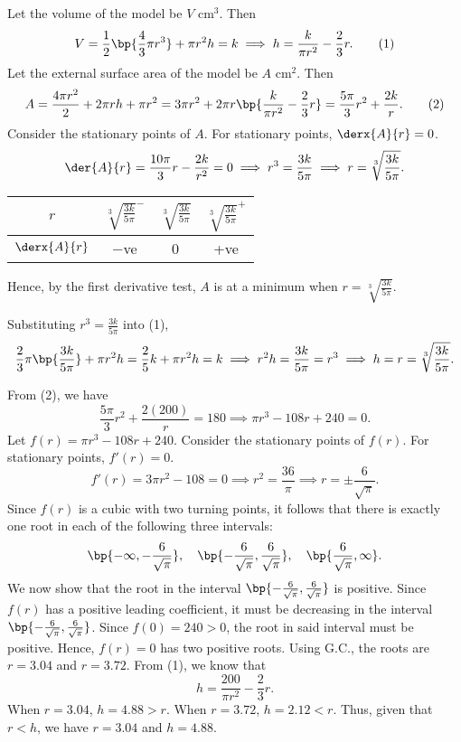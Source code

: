 \begin{solution}
    \begin{ppart}
        Let the volume of the model be $V$ cm$^3$. Then \[V = \frac12\bp{\frac43 \pi r^3} + \pi r^2 h = k \implies h = \frac{k}{\pi r^2}-\frac23 r. \tag{1}\] Let the external surface area of the model be $A$ cm$^2$. Then \[A = \frac{4\pi r^2}2 + 2\pi r h + \pi r^2 = 3\pi r^2 + 2\pi r\bp{\frac{k}{\pi r^2}-\frac23 r} = \frac{5\pi}3 r^2 + \frac{2k}{r}. \tag{2}\] Consider the stationary points of $A$. For stationary points, $\derx{A}{r} = 0$. \[\der{A}{r} = \frac{10\pi}3 r - \frac{2k}{r^2} = 0 \implies r^3 = \frac{3k}{5\pi} \implies r = \sqrt[3]{\frac{3k}{5\pi}}.\]

        \begin{table}[H]
            \centering
            \begin{tabular}{|c|c|c|c|}
            \hline
            $r$ & $\sqrt[3]{\frac{3k}{5\pi}}^-$ & $\sqrt[3]{\frac{3k}{5\pi}}$ & $\sqrt[3]{\frac{3k}{5\pi}}^+$ \\\hline
            $\derx{A}{r}$ & $-$ve   & 0 & +ve   \\\hline
            \end{tabular}
        \end{table}
        Hence, by the first derivative test, $A$ is at a minimum when $r = \sqrt[3]{\frac{3k}{5\pi}}$.

        Substituting $r^3 = \frac{3k}{5\pi}$ into (1), \[\frac23 \pi \bp{\frac{3k}{5\pi}} + \pi r^2 h = \frac{2}{5}k + \pi r^2h = k \implies r^2 h = \frac{3k}{5\pi} = r^3 \implies h = r = \sqrt[3]{\frac{3k}{5\pi}}.\]
    \end{ppart}
    \begin{ppart}
        From (2), we have \[\frac{5\pi}3 r^2 + \frac{2(200)}{r} = 180 \implies \pi r^3 - 108r + 240 = 0.\] Let $f(r) = \pi r^3 - 108r + 240$. Consider the stationary points of $f(r)$. For stationary points, $f'(r) = 0$. \[f'(r) = 3\pi r^2 - 108 = 0 \implies r^2 = \frac{36}{\pi} \implies r = \pm \frac6{\sqrt\pi}.\] Since $f(r)$ is a cubic with two turning points, it follows that there is exactly one root in each of the following three intervals: \[\bp{-\infty, -\frac6{\sqrt\pi}}, \quad \bp{-\frac6{\sqrt\pi}, \frac6{\sqrt\pi}}, \quad \bp{\frac6{\sqrt\pi}, \infty}.\] We now show that the root in the interval $\bp{-\frac6{\sqrt\pi}, \frac6{\sqrt\pi}}$ is positive. Since $f(r)$ has a positive leading coefficient, it must be decreasing in the interval $\bp{-\frac6{\sqrt\pi}, \frac6{\sqrt\pi}}$. Since $f(0) = 240 > 0$, the root in said interval must be positive. Hence, $f(r) = 0$ has two positive roots. Using G.C., the roots are $r = 3.04$ and $r = 3.72$. From (1), we know that \[h = \frac{200}{\pi r^2} - \frac23 r.\] When $r = 3.04$, $h = 4.88 > r$. When $r = 3.72$, $h = 2.12 < r$. Thus, given that $r < h$, we have $r = 3.04$ and $h = 4.88$.
    \end{ppart}
\end{solution}

